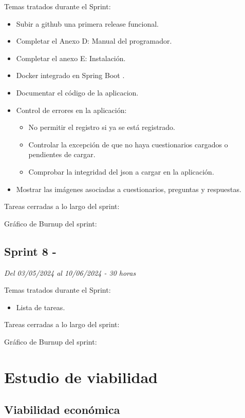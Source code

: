 Temas tratados durante el Sprint:
\begin{itemize}
	\item Subir a github una primera release funcional.
	\item Completar el Anexo D: Manual del programador.
	\item Completar el anexo E: Instalación.
	\item Docker integrado en Spring Boot \cite{web:SpringDocker}.
	\item Documentar el código de la aplicacion.
	\item Control de errores en la aplicación:
	\begin{itemize}
		\item No permitir el registro si ya se está registrado.
		\item Controlar la excepción de que no haya cuestionarios cargados o pendientes de cargar.
		\item Comprobar la integridad del json a cargar en la aplicación.
	\end{itemize}
	\item Mostrar las imágenes asociadas a cuestionarios, preguntas y respuestas.
\end{itemize}

Tareas cerradas a lo largo del sprint:

Gráfico de Burnup del sprint:


\subsection{Sprint 8 - }
\textit{Del 03/05/2024 al 10/06/2024 - 30 horas}

Temas tratados durante el Sprint:
\begin{itemize}
	\item
	Lista de tareas.
\end{itemize}

Tareas cerradas a lo largo del sprint:

Gráfico de Burnup del sprint:

\section{Estudio de viabilidad}

\subsection{Viabilidad económica}

